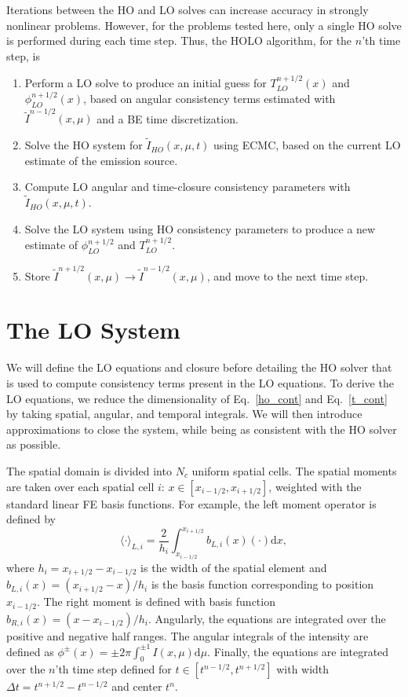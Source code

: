 \documentclass{anstrans}
\renewcommand{\d}{\mathrm{d}}
\newcommand{\mom}[1]{\langle #1 \rangle}
\newcommand{\xr}{{x_{i+1/2}}}
\begin{document}
Iterations between the HO and LO solves can increase accuracy in strongly nonlinear
problems. However, for the problems tested here, only a single HO solve is performed during each
time step.  Thus, the HOLO algorithm, for the $n$'th time step, is
\begin{enumerate}
    \item Perform a LO solve to produce an initial guess for $T_{LO}^{n+1/2}(x)$
        and $\phi_{LO}^{n+1/2}(x)$, based on angular consistency terms estimated with
        $\tilde{I}^{n-1/2}(x,\mu)$ and a BE time discretization.
\item Solve the HO system for $\tilde{I}_{HO}(x,\mu,t)$ using ECMC, based on the current
    LO estimate of the emission source.%
\item Compute LO angular and time-closure consistency parameters with
    $\tilde{I}_{HO}(x,\mu,t)$.  
\item Solve the LO system using HO consistency parameters to produce a new
    estimate of $\phi^{n+1/2}_{LO}$ and $T^{n+1/2}_{LO}$.
\item Store $\tilde{I}^{n+1/2}(x,\mu)\rightarrow\tilde{I}^{n-1/2}(x,\mu)$, and move to the next time step.
\end{enumerate}

\section{The LO System}
\label{sec:lo}

We will define the LO equations and closure before detailing the HO solver that is used to compute
consistency terms present in the LO equations.
To derive the LO equations, we reduce the dimensionality of Eq.~\eqref{ho_cont} and
Eq.~\eqref{t_cont} by taking spatial, angular, and
temporal integrals.  We will then introduce approximations to
close the system, while being as consistent with the HO solver as possible. 

The spatial domain is divided into $N_c$ uniform spatial cells.
The spatial moments are taken over each spatial cell $i$:
$x\in[x_{i-1/2},x_{i+1/2}]$, weighted with the standard linear FE basis functions.  For example, the left moment operator is defined by
\begin{equation}\label{x_mom}
    \mom{\cdot}_{L,i} = \frac{2}{h_i} \int_{x_{i-1/2}}^{\xr} b_{L,i}(x) (\cdot) \d x,
\end{equation}
where $h_i=x_{i+1/2}-x_{i-1/2}$ is the width of the spatial element and
$b_{L,i}(x)=(x_{i+1/2}-x)/h_i$ is the basis function corresponding to position
$x_{i-1/2}$.  The right moment is defined with basis function $b_{R,i}(x)=(x - x_{i-1/2})/h_i$.
Angularly, the equations are integrated over the positive and negative half
ranges.  The angular integrals of the intensity are defined as $\phi^\pm(x) = \pm2\pi
\int_0^{\pm 1} I(x,\mu) \d \mu$.  Finally, the equations are integrated over the $n$'th
time step defined for $t\in[t^{n-1/2},t^{n+1/2}]$ with width $\Delta t = t^{n+1/2}-t^{n-1/2}$ and
center $t^{n}$.  
\end{document}
